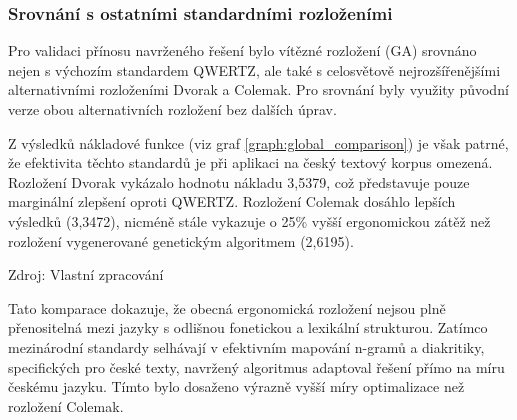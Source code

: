 \documentclass[a4paper, twoside, 12pt, czech]{article}
\begin{document}
\subsubsection{Srovnání s ostatními standardními rozloženími}
Pro validaci přínosu navrženého řešení bylo vítězné rozložení (GA) srovnáno 
nejen s výchozím standardem QWERTZ, ale také s celosvětově nejrozšířenějšími 
alternativními rozloženími Dvorak a Colemak. Pro srovnání byly využity původní 
verze obou alternativních rozložení bez dalších úprav.

Z výsledků nákladové funkce (viz graf \ref{graph:global_comparison}) je však patrné, že efektivita těchto 
standardů je při aplikaci na český textový korpus omezená. Rozložení Dvorak 
vykázalo hodnotu nákladu 3,5379, což představuje pouze marginální zlepšení oproti 
QWERTZ. Rozložení Colemak dosáhlo lepších výsledků (3,3472), nicméně stále vykazuje 
o 25\space\% vyšší ergonomickou zátěž než rozložení vygenerované genetickým algoritmem (2,6195).

\begin{graph}[h!]
    \centering
    \caption{Srovnání optimalizovaného rozložení s globálními standardy}
    \vspace{0.5cm}
    
    \label{graph:global_comparison}
    \small{Zdroj: Vlastní zpracování}
\end{graph}

Tato komparace dokazuje, že obecná ergonomická rozložení nejsou plně 
pře\-nositelná mezi jazyky s odlišnou fonetickou a lexikální strukturou. Zatímco 
mezinárodní standardy selhávají v efektivním mapování n-gramů 
a diakritiky, specifických pro české texty, navržený algoritmus adaptoval řešení přímo na míru 
českému jazyku. Tímto bylo dosaženo výrazně vyšší míry optimalizace než rozlo\-žení Colemak.
\end{document}
